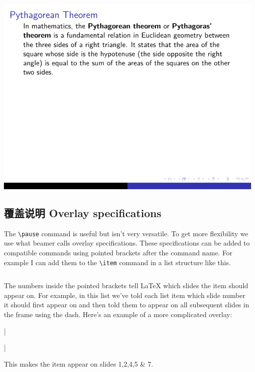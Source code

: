 \begin{column}{0.5\textwidth}
\includegraphics[page=4]{examples/beamer/beameroverlay02.pdf}

\subsection{覆盖说明 Overlay specifications}

The \verb|\pause| command is useful but isn't very versatile. To get more flexibility we use what beamer calls overlay specifications. These specifications can be added to compatible commands using pointed brackets after the command name. For example I can add them to the \verb|\item| command in a list structure like this.

\inputminted[linenos=true]{latex}{examples/beamer/beameroverlay03.tex}

The numbers inside the pointed brackets tell LaTeX which slides the item should appear on. For example, in this list we've told each list item which slide number it should first appear on and then told them to appear on all subsequent slides in the frame using the dash. Here's an example of a more complicated overlay:

|\item<-2,4-5,7>|

This makes the item appear on slides 1,2,4,5 \& 7.


\end{column}
